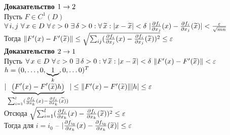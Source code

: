 \documentclass[12pt]{article}
\begin{document}
\textbf{Доказательство $1 \rto 2$}\\
Пусть $F\in C^1(D)$\\
$\fall i,j\ \fall x \in D\ \fall \eps > 0\ \ex \delta > 0: \fall \ot x:|x-\ot x| < \delta\ |\frac{\partial f_i}{\partial x_j}(x)-\frac{\partial f_i}{\partial x_j}(\ot x)| < \frac\eps{\sqrt{mn}}$\\
Тогда $\|F'(x) - F'(\ot x)\| \leq \sqrt{\sum_{ij} (\frac{\partial f_i}{\partial x_j}(x)-\frac{\partial f_i}{\partial x_j}(\ot x))^2} \leq \eps$\\
\textbf{Доказательство $2 \rto 1$}\\
Пусть $\fall x \in D\ \fall \eps > 0\ \ex \delta > 0: \fall \ot x:|x-\ot x| < \delta\ \|F'(x)-F'(\ot x)\| < \eps$\\
$h = (0, \ldots, 0, \ub{k}1, 0, \ldots 0)^T$\\
$|\ub{\sum_{i=1}^l (\frac{\partial f_i}{\partial x_k}(x)-\frac{\partial f_i}{\partial x_k}(\ot x))}{(F'(x)-F'(\ot x)h)}| \leq \| F'(x)-F'(\ot x)\||h| \leq \eps$\\
Отсюда $\sqrt{\sum_{i=1}^l (\frac{\partial f_i}{\partial x_k}(x)-\frac{\partial f_i}{\partial x_k}(\ot x))^2} \leq \eps$\\
Тогда для $i=i_0$ -- $|\frac{\partial f_{i_0}}{\partial x_k}(x)-\frac{\partial f_{i_0}}{\partial x_k}(\ot x)| \leq \eps$
\end{document}
